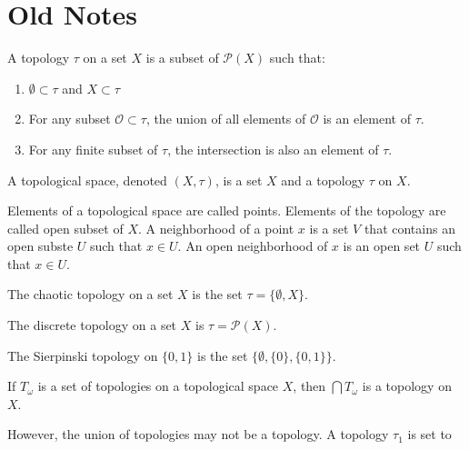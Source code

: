 \documentclass[crop=false,class=book,oneside]{standalone}
\begin{document}
    \section{Old Notes}
        \begin{definition}
            A topology $\tau$ on a set $X$ is a subset
            of $\mathcal{P}(X)$ such that:
            \begin{enumerate}
                \item $\emptyset\subset\tau$ and $X\subset\tau$
                \item For any subset $\mathcal{O}\subset\tau$, the
                      union of all elements of $\mathcal{O}$ is an
                      element of $\tau$.
                \item For any finite subset of $\tau$, the
                      intersection is also an element of $\tau$.
            \end{enumerate}
        \end{definition}
        \begin{definition}
            A topological space, denoted $(X,\tau)$, is a set
            $X$ and a topology $\tau$ on $X$.
        \end{definition}
        Elements of a topological space are called points.
        Elements of the topology are called open subset of $X$.
        A neighborhood of a point $x$ is a set $V$ that contains
        an open subste $U$ such that $x\in{U}$. An open neighborhood
        of $x$ is an open set $U$ such that $x\in{U}$.
        \begin{example}
            The chaotic topology on a set
            $X$ is the set $\tau=\{\emptyset,X\}$.
        \end{example}
        \begin{example}
            The discrete topology on a set $X$ is
            $\tau=\mathcal{P}(X)$.
        \end{example}
        \begin{example}
            The Sierpinski topology
            on $\{0,1\}$ is the set
            $\{\emptyset,\{0\},\{0,1\}\}$.
        \end{example}
        \begin{theorem}
            If $T_{\omega}$ is a set of topologies on
            a topological space $X$, then
            $\bigcap{T_{\omega}}$ is a topology on $X$.
        \end{theorem}
        However, the union of topologies may not be a
        topology. A topology $\tau_{1}$ is set to
\end{document}
